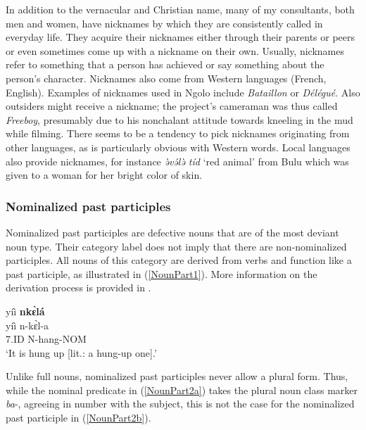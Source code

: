 In addition to the vernacular and Christian name, many of my consultants, both men and women, have nicknames by which they are consistently called in everyday life. They acquire their nicknames either through their parents or peers or even sometimes come up with a nickname on their own. Usually, nicknames refer to something that a person has achieved or say something about the person's character. Nicknames also come from Western languages (French, English). Examples of nicknames used in Ngolo include {\itshape Bataillon} or {\itshape Délégué}. Also outsiders might receive a nickname; the project's cameraman was thus called {\itshape Freeboy}, presumably due to his nonchalant attitude towards kneeling in the mud while filming. There seems to be a tendency to pick nicknames originating from other languages, as is particularly obvious with Western words. Local languages also provide nicknames, for instance {\itshape ə̀və́lə̀ tíd} `red animal' from Bulu which was given to a woman for her bright color of skin.



\subsubsection{Nominalized past participles}
\label{sec:NounPart}

Nominalized past participles are defective nouns that are of the most deviant noun type. Their category label does not imply that there are non-nominalized participles. All nouns of this category are derived from verbs and function like a past participle, as illustrated in (\ref{NounPart1}). More information on the derivation process is provided in .

\begin{exe}
\ex\label{NounPart1} 
\glll yíì {\bfseries nkɛ̀lá} \\
yíì n-kɛ̀l-a \\
7.ID N-hang-NOM \\
\trans `It is hung up [lit.: a hung-up one].'
\end{exe}

Unlike full nouns, nominalized past participles never allow a plural form. Thus, while the nominal predicate in (\ref{NounPart2a}) takes the plural noun class marker {\itshape ba}-, agreeing in number with the subject, this is not the case for the nominalized past participle in (\ref{NounPart2b}).  

